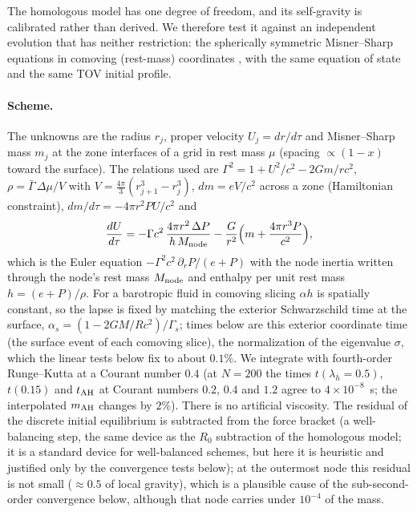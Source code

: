 \documentclass[11pt]{article}
\begin{document}
The homologous model has one degree of freedom, and its self-gravity is calibrated rather than derived. We therefore test it against an independent evolution that has neither restriction: the spherically symmetric Misner--Sharp equations in comoving (rest-mass) coordinates \citep{MisnerSharp1964,MayWhite1966}, with the same equation of state and the same TOV initial profile.

\paragraph{Scheme.} The unknowns are the radius $r_j$, proper velocity $U_j=dr/d\tau$ and Misner--Sharp mass $m_j$ at the zone interfaces of a grid in rest mass $\mu$ (spacing $\propto(1-x)$ toward the surface). The relations used are $\Gamma^2=1+U^2/c^2-2Gm/rc^2$, $\rho=\bar\Gamma\,\Delta\mu/V$ with $V=\tfrac{4\pi}{3}(r_{j+1}^3-r_j^3)$, $dm=eV/c^2$ across a zone (Hamiltonian constraint), $dm/d\tau=-4\pi r^2PU/c^2$ and
\begin{equation}
\frac{dU}{d\tau}=-\Gamma c^2\,\frac{4\pi r^2\,\Delta P}{h\,M_{\rm node}}-\frac{G}{r^2}\Big(m+\frac{4\pi r^3P}{c^2}\Big),
\end{equation}
which is the Euler equation $-\Gamma^2c^2\,\partial_rP/(e+P)$ with the node inertia written through the node's rest mass $M_{\rm node}$ and enthalpy per unit rest mass $h=(e+P)/\rho$. For a barotropic fluid in comoving slicing $\alpha h$ is spatially constant, so the lapse is fixed by matching the exterior Schwarzschild time at the surface, $\alpha_s=(1-2GM/Rc^2)/\Gamma_s$; times below are this exterior coordinate time (the surface event of each comoving slice), the normalization of the eigenvalue $\sigma$, which the linear tests below fix to about $0.1\%$. We integrate with fourth-order Runge--Kutta at a Courant number $0.4$ (at $N=200$ the times $t(\lambda_h=0.5)$, $t(0.15)$ and $t_{\rm AH}$ at Courant numbers $0.2$, $0.4$ and $1.2$ agree to $4\times10^{-8}$~s; the interpolated $m_{\rm AH}$ changes by $2\%$). There is no artificial viscosity. The residual of the discrete initial equilibrium is subtracted from the force bracket (a well-balancing step, the same device as the $R_0$ subtraction of the homologous model; it is a standard device for well-balanced schemes, but here it is heuristic and justified only by the convergence tests below); at the outermost node this residual is not small ($\approx0.5$ of local gravity), which is a plausible cause of the sub-second-order convergence below, although that node carries under $10^{-4}$ of the mass.
\end{document}
